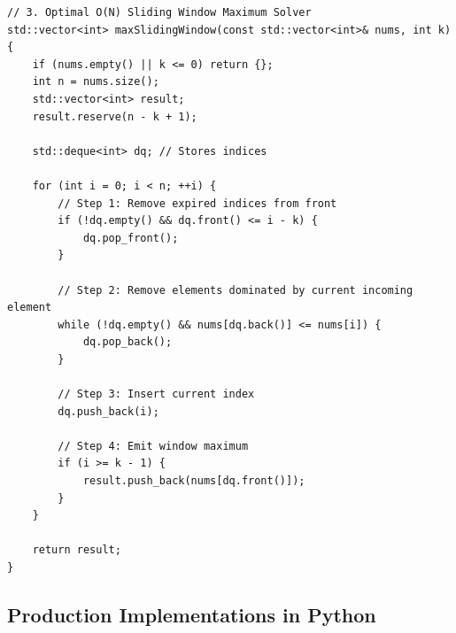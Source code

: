 \documentclass[10pt,journal,compsoc,onecolumn]{IEEEtran}
\begin{document}
\begin{verbatim}
// 3. Optimal O(N) Sliding Window Maximum Solver
std::vector<int> maxSlidingWindow(const std::vector<int>& nums, int k) {
    if (nums.empty() || k <= 0) return {};
    int n = nums.size();
    std::vector<int> result;
    result.reserve(n - k + 1);

    std::deque<int> dq; // Stores indices

    for (int i = 0; i < n; ++i) {
        // Step 1: Remove expired indices from front
        if (!dq.empty() && dq.front() <= i - k) {
            dq.pop_front();
        }

        // Step 2: Remove elements dominated by current incoming element
        while (!dq.empty() && nums[dq.back()] <= nums[i]) {
            dq.pop_back();
        }

        // Step 3: Insert current index
        dq.push_back(i);

        // Step 4: Emit window maximum
        if (i >= k - 1) {
            result.push_back(nums[dq.front()]);
        }
    }

    return result;
}
\end{verbatim}

\subsection{Production Implementations in Python}
\end{document}
